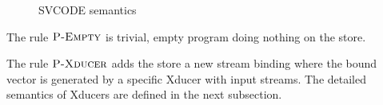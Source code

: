 	
\begin{figure}[!h]\large 

\\


 \\[2ex]

 \\[4ex]

\\[2ex]
\\[4ex]


\caption{SVCODE semantics}
\label{fig-svcode-semantics}
\end{figure}

The rule $\textsc{P-Empty}$ is trivial, empty program doing nothing on the store. 

The rule $\textsc{P-Xducer}$ adds the store a new stream binding where the bound vector is generated by a specific Xducer with input streams. The detailed semantics of Xducers are defined in the next subsection. 


